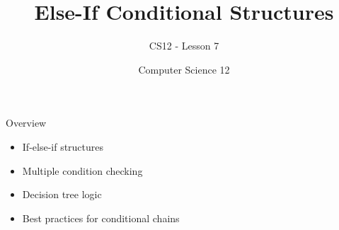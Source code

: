\documentclass[10pt]{beamer}
\title{Else-If Conditional Structures}
\subtitle{CS12 - Lesson 7}
\author{Computer Science 12}
\date{}
\begin{document}
\begin{frame}
    \titlepage
\end{frame}

\begin{frame}{Overview}
    \begin{itemize}
        \item If-else-if structures
        \item Multiple condition checking
        \item Decision tree logic
        \item Best practices for conditional chains
    \end{itemize}
\end{frame}

\end{document}
